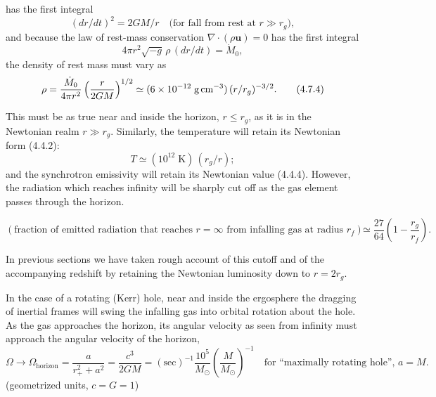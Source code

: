 


has the first integral
\begin{equation}
(dr/dt)^2 = 2GM/r \quad \text{(for fall from rest at } r \gg r_g\text{)}, \tag{4.7.2}
\end{equation}
and because the law of rest-mass conservation $\nabla \cdot (\rho \mathbf{u}) = 0$ has the first integral
\begin{equation}
4\pi r^2 \sqrt{-g}\, \rho\, (dr/dt) = \dot{M}_0, \tag{4.7.3}
\end{equation}
the density of rest mass must vary as
\begin{equation}
\rho = \frac{\dot{M}_0}{4\pi r^2} \left(\frac{r}{2GM}\right)^{1/2}
\simeq (6 \times 10^{-12} \;\text{g\,cm}^{-3})\, (r/r_g)^{-3/2}. \tag{4.7.4}
\end{equation}

This must be as true near and inside the horizon, $r \leq r_g$, as it is in the Newtonian
realm $r \gg r_g$. Similarly, the temperature will retain its Newtonian form (4.4.2):
\begin{equation}
T \simeq (10^{12}\;\text{K})\, (r_g/r); \tag{4.7.5}
\end{equation}
and the synchrotron emissivity will retain its Newtonian value (4.4.4). However,
the radiation which reaches infinity will be sharply cut off as the gas element
passes through the horizon.

\begin{equation}
\left(\text{fraction of emitted radiation that reaches } r = \infty
\text{ from infalling gas at radius } r_f\right)
\simeq \frac{27}{64}\left(1 - \frac{r_g}{r_f}\right). \tag{4.7.6}
\end{equation}

In previous sections we have taken rough account of this cutoff and of the
accompanying redshift by retaining the Newtonian luminosity down to $r = 2r_g$.

In the case of a rotating (Kerr) hole, near and inside the ergosphere the
dragging of inertial frames will swing the infalling gas into orbital rotation
about the hole. As the gas approaches the horizon, its angular velocity as seen
from infinity must approach the angular velocity of the horizon,
\begin{equation}
\Omega \to \Omega_{\text{horizon}} = \frac{a}{r_+^2 + a^2}
= \frac{c^3}{2GM} = \left(\text{sec}\right)^{-1}
\frac{10^5}{M_\odot}\left(\frac{M}{M_\odot}\right)^{-1}
\quad \text{for ``maximally rotating hole'', } a = M. \tag{4.7.7}
\end{equation}
(geometrized units, $c = G = 1$)

